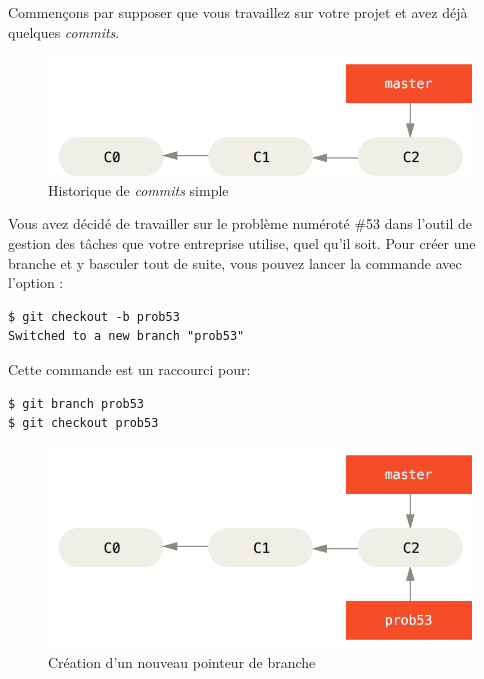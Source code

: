 Commençons par supposer que vous travaillez sur votre projet et avez déjà quelques \emph{commits}.

\begin{figure}[!h]
  \centering
  \includegraphics{images/basic-branching-1}
  \caption{Historique de \emph{commits} simple}
  \label{fig:git:basic-branching-1}
\end{figure}

Vous avez décidé de travailler sur le problème numéroté \#53 dans l'outil de gestion des tâches que votre entreprise utilise, quel qu'il soit.
Pour créer une branche et y basculer tout de suite, vous pouvez lancer la commande  avec l'option :
\begin{Schunk}
\begin{Verbatim}
$ git checkout -b prob53
Switched to a new branch "prob53"
\end{Verbatim}
\end{Schunk}

Cette commande est un raccourci pour:
\begin{Schunk}
\begin{Verbatim}
$ git branch prob53
$ git checkout prob53
\end{Verbatim}
\end{Schunk}

\begin{figure}[!h]
  \centering
  \includegraphics{images/basic-branching-2}
  \caption{Création d'un nouveau pointeur de branche}
  \label{fig:git:basic-branching-2}
\end{figure}


